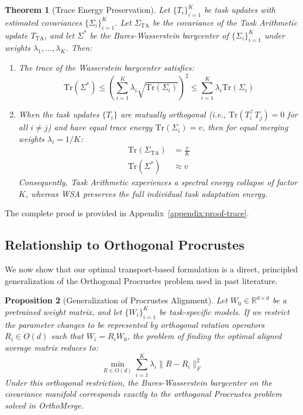 \documentclass{article}
\theoremstyle{plain}
\newtheorem{theorem}{Theorem}[section]
\newtheorem{proposition}[theorem]{Proposition}
\theoremstyle{definition}
\theoremstyle{remark}
\begin{document}
\begin{theorem}[Trace Energy Preservation]
Let $\{T_i\}_{i=1}^K$ be task updates with estimated covariances $\{\Sigma_i\}_{i=1}^K$. Let $\Sigma_{\text{TA}}$ be the covariance of the Task Arithmetic update $T_{\text{TA}}$, and let $\Sigma^*$ be the Bures-Wasserstein barycenter of $\{\Sigma_i\}_{i=1}^K$ under weights $\lambda_1, \dots, \lambda_K$. Then:
\begin{enumerate}
  \item The trace of the Wasserstein barycenter satisfies:
  \begin{equation}
    \text{Tr}(\Sigma^*) \leq \left( \sum_{i=1}^K \lambda_i \sqrt{\text{Tr}(\Sigma_i)} \right)^2 \leq \sum_{i=1}^K \lambda_i \text{Tr}(\Sigma_i)
  \end{equation}
  \item When the task updates $\{T_i\}$ are mutually orthogonal (i.e., $\text{Tr}(T_i^\top T_j) = 0$ for all $i \neq j$) and have equal trace energy $\text{Tr}(\Sigma_i) = v$, then for equal merging weights $\lambda_i = 1/K$:
  \begin{align}
    \text{Tr}(\Sigma_{\text{TA}}) &= \frac{v}{K} \\
    \text{Tr}(\Sigma^*) &\approx v
  \end{align}
  Consequently, Task Arithmetic experiences a spectral energy collapse of factor $K$, whereas WSA preserves the full individual task adaptation energy.
\end{enumerate}
\end{theorem}

The complete proof is provided in Appendix~\ref{appendix:proof-trace}.

\subsection{Relationship to Orthogonal Procrustes}
We now show that our optimal transport-based formulation is a direct, principled generalization of the Orthogonal Procrustes problem used in past literature.

\begin{proposition}[Generalization of Procrustes Alignment]
Let $W_0 \in \mathbb{R}^{d \times d}$ be a pretrained weight matrix, and let $\{W_i\}_{i=1}^K$ be task-specific models. If we restrict the parameter changes to be represented by orthogonal rotation operators $R_i \in O(d)$ such that $W_i = R_i W_0$, the problem of finding the optimal aligned average matrix reduces to:
\begin{equation}
  \label{eq:procrustes}
  \min_{R \in O(d)} \sum_{i=1}^K \lambda_i \| R - R_i \|_F^2
\end{equation}
Under this orthogonal restriction, the Bures-Wasserstein barycenter on the covariance manifold corresponds exactly to the orthogonal Procrustes problem solved in OrthoMerge.
\end{proposition}
\end{document}
